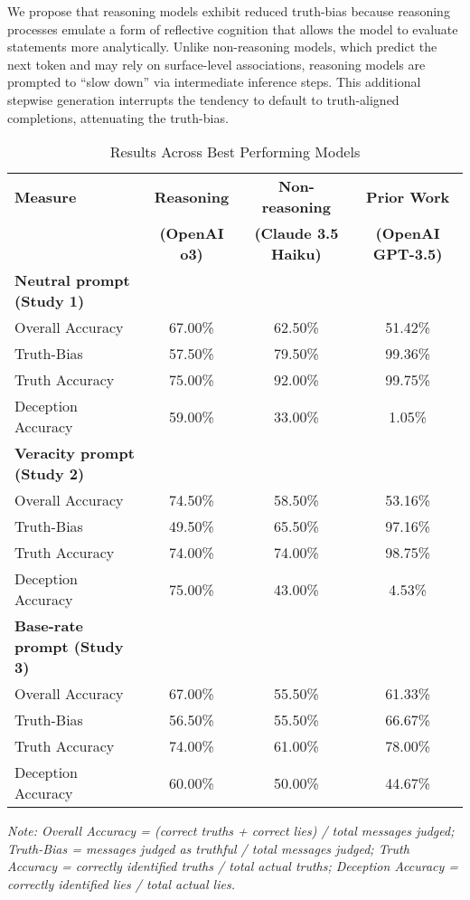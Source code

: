 \documentclass{article}
\begin{document}
We propose that reasoning models exhibit reduced truth-bias because reasoning processes emulate a form of reflective cognition that allows the model to evaluate statements more analytically. Unlike non-reasoning models, which predict the next token and may rely on surface-level associations, reasoning models are prompted to ``slow down'' via intermediate inference steps. This additional stepwise generation interrupts the tendency to default to truth-aligned completions, attenuating the truth-bias.

\begin{table}[ht]
\centering
\caption{Results Across Best Performing Models}
\begin{tabular}{lccc}
\toprule
\textbf{Measure} & \textbf{Reasoning} & \textbf{Non-reasoning} & \textbf{Prior Work} \citep{markowitz_generative_2024} \\
 & \textbf{(OpenAI o3)} & \textbf{(Claude 3.5 Haiku)} & \textbf{(OpenAI GPT-3.5)} \\
\midrule
\textbf{Neutral prompt (Study 1)} & & & \\
Overall Accuracy & 67.00\% & 62.50\% & 51.42\% \\
Truth-Bias & 57.50\% & 79.50\% & 99.36\% \\
Truth Accuracy & 75.00\% & 92.00\% & 99.75\% \\
Deception Accuracy & 59.00\% & 33.00\% & 1.05\% \\
\midrule
\textbf{Veracity prompt (Study 2)} & & & \\
Overall Accuracy & 74.50\% & 58.50\% & 53.16\% \\
Truth-Bias & 49.50\% & 65.50\% & 97.16\% \\
Truth Accuracy & 74.00\% & 74.00\% & 98.75\% \\
Deception Accuracy & 75.00\% & 43.00\% & 4.53\% \\
\midrule
\textbf{Base-rate prompt (Study 3)} & & & \\
Overall Accuracy & 67.00\% & 55.50\% & 61.33\% \\
Truth-Bias & 56.50\% & 55.50\% & 66.67\% \\
Truth Accuracy & 74.00\% & 61.00\% & 78.00\% \\
Deception Accuracy & 60.00\% & 50.00\% & 44.67\% \\
\bottomrule
\end{tabular}
\begin{minipage}{0.9\linewidth}
\vspace{0.05in}
\footnotesize
\textit{Note: Overall Accuracy = (correct truths + correct lies) / total messages judged; Truth-Bias = messages judged as truthful / total messages judged; Truth Accuracy = correctly identified truths / total actual truths; Deception Accuracy = correctly identified lies / total actual lies.}
\end{minipage}
\end{table}
\end{document}
